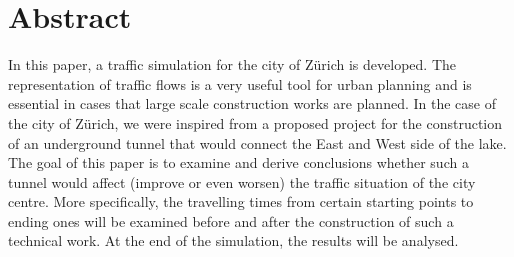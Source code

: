 \documentclass[11pt]{article}
\begin{document}

\newpage
















\newpage








\tableofcontents

\newpage




\section{Abstract}
In this paper, a traffic simulation for the city of Z\"urich is developed. The representation of traffic flows is a very useful tool for urban planning and is essential in cases that large scale construction works are planned. In the case of the city of Z\"urich, we were inspired from a proposed project for the construction of an underground tunnel that would connect the East and West side of the lake. The goal of this paper is to examine and derive conclusions whether such a tunnel would affect (improve or even worsen) the traffic situation of the city centre. More specifically, the travelling times from certain starting points to ending ones will be examined before and after the construction of such a technical work. At the end of the simulation, the results will be analysed.
\end{document}
